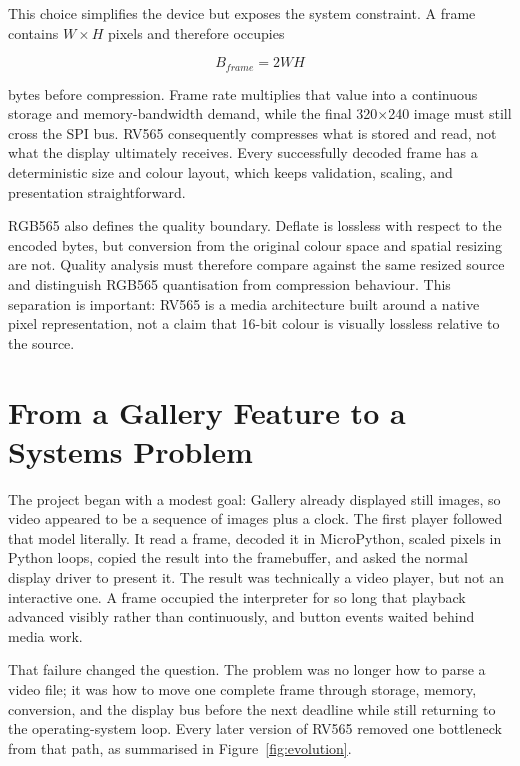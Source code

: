 \documentclass[11pt,twocolumn]{article}
\begin{document}
This choice simplifies the device but exposes the system constraint.  A frame
contains $W\times H$ pixels and therefore occupies

\begin{equation}
B_{frame}=2WH
\end{equation}

bytes before compression.  Frame rate multiplies that value into a continuous
storage and memory-bandwidth demand, while the final 320$\times$240 image must
still cross the SPI bus.  RV565 consequently compresses what is stored and
read, not what the display ultimately receives.  Every successfully decoded
frame has a deterministic size and colour layout, which keeps validation,
scaling, and presentation straightforward.

RGB565 also defines the quality boundary.  Deflate is lossless with respect to
the encoded bytes, but conversion from the original colour space and spatial
resizing are not.  Quality analysis must therefore compare against the same
resized source and distinguish RGB565 quantisation from compression behaviour.
This separation is important: RV565 is a media architecture built around a
native pixel representation, not a claim that 16-bit colour is visually
lossless relative to the source.

\section{From a Gallery Feature to a Systems Problem}

The project began with a modest goal: Gallery already displayed still images,
so video appeared to be a sequence of images plus a clock.  The first player
followed that model literally.  It read a frame, decoded it in MicroPython,
scaled pixels in Python loops, copied the result into the framebuffer, and
asked the normal display driver to present it.  The result was technically a
video player, but not an interactive one.  A frame occupied the interpreter
for so long that playback advanced visibly rather than continuously, and
button events waited behind media work.

That failure changed the question.  The problem was no longer how to parse a
video file; it was how to move one complete frame through storage, memory,
conversion, and the display bus before the next deadline while still returning
to the operating-system loop.  Every later version of RV565 removed one
bottleneck from that path, as summarised in Figure~\ref{fig:evolution}.
\end{document}
